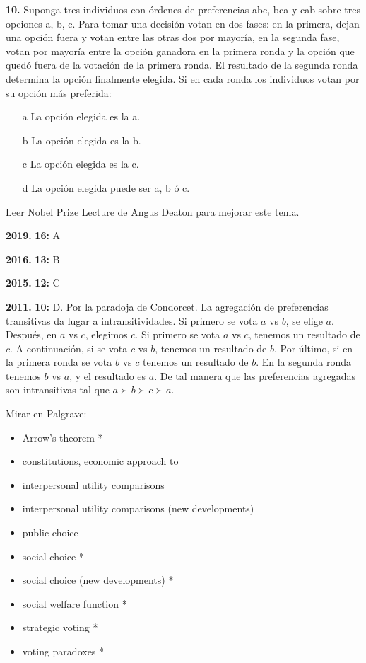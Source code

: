 \documentclass{nuevotema}
\begin{document}

\textbf{10.} Suponga tres individuos con órdenes de preferencias abc, bca y cab sobre tres opciones a, b, c. Para tomar una decisión votan en dos fases: en la primera, dejan una opción fuera y votan entre las otras dos por mayoría, en la segunda fase, votan por mayoría entre la opción ganadora en la primera ronda y la opción que quedó fuera de la votación de la primera ronda. El resultado de la segunda ronda determina la opción finalmente elegida. Si en cada ronda los individuos votan por su opción más preferida:

\begin{itemize}
	\item[a] La opción elegida es la a. 
	\item[b] La opción elegida es la b.
	\item[c] La opción elegida es la c.
	\item[d] La opción elegida puede ser a, b ó c.
\end{itemize}

\notas

Leer Nobel Prize Lecture de Angus Deaton para mejorar este tema.

\textbf{2019.} \textbf{16:} A

\textbf{2016.} \textbf{13:} B

\textbf{2015.} \textbf{12:} C

\textbf{2011.} \textbf{10:} D. Por la paradoja de Condorcet. La agregación de preferencias transitivas da lugar a intransitividades. Si primero se vota $a$ vs $b$, se elige $a$. Después, en $a$ vs $c$, elegimos $c$. Si primero se vota $a$ vs $c$, tenemos un resultado de $c$. A continuación, si se vota $c$ vs $b$, tenemos un resultado de $b$. Por último, si en la primera ronda se vota $b$ vs $c$ tenemos un resultado de $b$. En la segunda ronda tenemos $b$ vs $a$, y el resultado es $a$. De tal manera que las preferencias agregadas son intransitivas tal que $a \succ b \succ c \succ a$.

\bibliografia

Mirar en Palgrave:
\begin{itemize}
	\item Arrow's theorem * 
	\item constitutions, economic approach to
	\item interpersonal utility comparisons
	\item interpersonal utility comparisons (new developments)
	\item public choice
	\item social choice * 
	\item social choice (new developments) *
	\item social welfare function *
	\item strategic voting *
	\item voting paradoxes *
\end{itemize}
\end{document}
